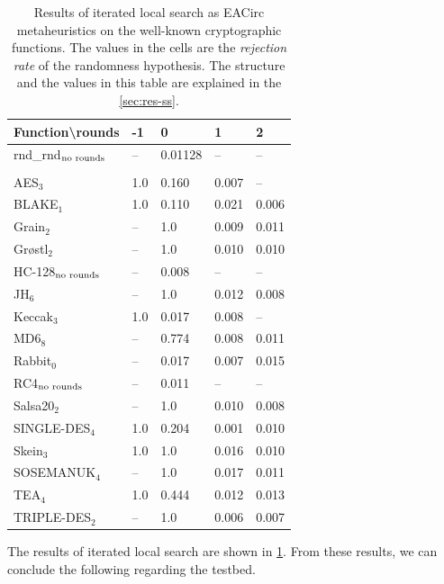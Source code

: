 \documentclass[
  print, %
  Table,   %
  nolof,     %
  nolot,     %
  11pt, %
  oneside  %
]{fithesis3}
\newcommand{\fd}{\cellcolor{myred!15}}
\newcommand{\fn}{\cellcolor{mygreen!20}}
\begin{document}
\begin{table}[t]
\centering
\begin{tabular}{l|l l l l}
Function\textbackslash{}rounds & -1 & 0 & 1 & 2\\ \hline
rnd\_rnd$_{\textnormal{no rounds}}$ & --  & \fn{}0.01128& --   & -- \\\\
AES$_{3}$        & \fd{}1.0   & \fd{}0.160 & \fn{}0.007 & \fn{}--   \\
BLAKE$_{1}$      & \fd{}1.0   & \fd{}0.110 & \fn{}0.021 & \fn{}0.006\\
Grain$_{2}$      & \fd{}--    & \fd{}1.0   & \fn{}0.009 & \fn{}0.011\\
Gr\o stl$_{2}$   & \fd{}--    & \fd{}1.0   & \fn{}0.010 & \fn{}0.010\\
HC-128$_{\textnormal{no rounds}}$& -- & \fn{}0.008 & -- & --        \\
JH$_{6}$         & \fd{}--    & \fd{}1.0   & \fn{}0.012 & \fn{}0.008\\
Keccak$_{3}$     & \fd{}1.0   & \fn{}0.017 & \fn{}0.008 & \fn{}--   \\
MD6$_{8}$        & \fd{}--    & \fd{}0.774 & \fn{}0.008 & \fn{}0.011\\
Rabbit$_{0}$     &      --    & \fn{}0.017 & \fn{}0.007 & \fn{}0.015\\
RC4$_{\textnormal{no rounds}}$& -- & \fn{}0.011 & --    & --        \\
Salsa20$_{2}$    & \fd{}--    & \fd{}1.0   & \fn{}0.010 & \fn{}0.008\\
SINGLE-DES$_{4}$ & \fd{}1.0   & \fd{}0.204 & \fn{}0.001 & \fn{}0.010\\
Skein$_{3}$      & \fd{}1.0   & \fd{}1.0   & \fn{}0.016 & \fn{}0.010\\
SOSEMANUK$_{4}$  & \fd{}--    & \fd{}1.0   & \fn{}0.017 & \fn{}0.011\\
TEA$_{4}$        & \fd{}1.0   & \fd{}0.444 & \fn{}0.012 & \fn{}0.013\\
TRIPLE-DES$_{2}$ & \fd{}--    & \fd{}1.0   & \fn{}0.006 & \fn{}0.007
\end{tabular}
\caption{Results of iterated local search as EACirc metaheuristics on the well-known cryptographic functions. The values in the cells are the \textit{rejection rate} of the randomness hypothesis. The structure and the values in this table are explained in the \cref{sec:res-ss}.}
\label{table:res-usable-ils}
\end{table}

The results of iterated local search are shown in \cref{table:res-usable-ils}. From these results, we can conclude the following regarding the testbed.
\end{document}
